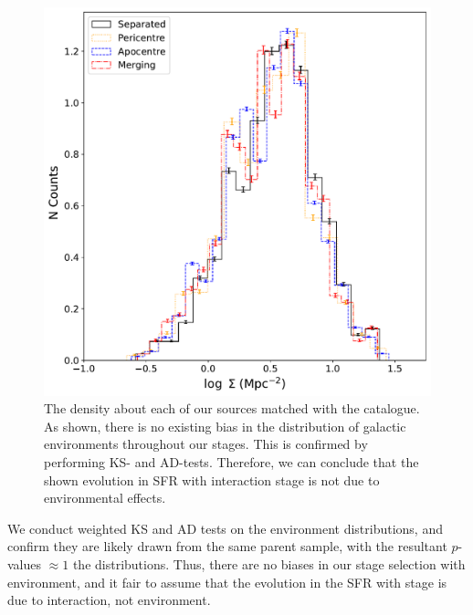 \begin{figure}
    \centering
    \includegraphics[width=\textwidth]{Chapter3/figures/density-stage.pdf}
    \caption[The density about each of our sources matched with the \citet{2017ApJ...837...16D} catalogue.]{The density about each of our sources matched with the \citet{2017ApJ...837...16D} catalogue. As shown, there is no existing bias in the distribution of galactic environments throughout our stages. This is confirmed by performing KS- and AD-tests. Therefore, we can conclude that the shown evolution in SFR with interaction stage is not due to environmental effects.}
    \label{fig:dens-stage}
\end{figure}

We conduct weighted KS and AD tests on the environment distributions, and confirm they are likely drawn from the same parent sample, with the resultant $p$-values $\approx1$ the distributions. Thus, there are no biases in our stage selection with environment, and it fair to assume that the evolution in the SFR with stage is due to interaction, not environment.

